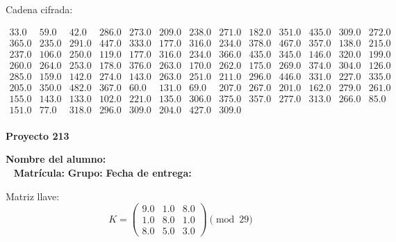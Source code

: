\documentclass[12pt]{article}
\begin{document}
Cadena cifrada:
\begin{center}
$\begin{array}{lllllllllllll}
33.0 & 59.0 & 42.0 & 286.0 & 273.0 & 209.0 & 238.0 & 271.0 & 182.0 & 351.0 & 435.0 & 309.0 & 272.0\\
365.0 & 235.0 & 291.0 & 447.0 & 333.0 & 177.0 & 316.0 & 234.0 & 378.0 & 467.0 & 357.0 & 138.0 & 215.0\\
237.0 & 106.0 & 250.0 & 119.0 & 177.0 & 316.0 & 234.0 & 366.0 & 435.0 & 345.0 & 146.0 & 320.0 & 199.0\\
260.0 & 264.0 & 253.0 & 178.0 & 376.0 & 263.0 & 170.0 & 262.0 & 175.0 & 269.0 & 374.0 & 304.0 & 126.0\\
285.0 & 159.0 & 142.0 & 274.0 & 143.0 & 263.0 & 251.0 & 211.0 & 296.0 & 446.0 & 331.0 & 227.0 & 335.0\\
205.0 & 350.0 & 482.0 & 367.0 & 60.0 & 131.0 & 69.0 & 207.0 & 267.0 & 201.0 & 162.0 & 279.0 & 261.0\\
155.0 & 143.0 & 133.0 & 102.0 & 221.0 & 135.0 & 306.0 & 375.0 & 357.0 & 277.0 & 313.0 & 266.0 & 85.0\\
151.0 & 77.0 & 318.0 & 296.0 & 309.0 & 204.0 & 427.0 & 309.0\\
\end{array}$
\end{center}

\newpage


\textbf{Proyecto 213}

\textbf{Nombre del alumno:} \underline{\hspace{13cm}}\\\
\vspace{1cm}
\textbf{Matrícula:} \underline{\hspace{4cm}} \hspace{1cm}
\textbf{Grupo:} \underline{\hspace{2cm}}
\textbf{Fecha de entrega:} \underline{\hspace{2cm}}

\medskip

Matriz llave:
\[
K = \begin{pmatrix}
9.0 & 1.0 & 8.0\\
1.0 & 8.0 & 1.0\\
8.0 & 5.0 & 3.0
\end{pmatrix} \pmod{29}
\]
\end{document}
